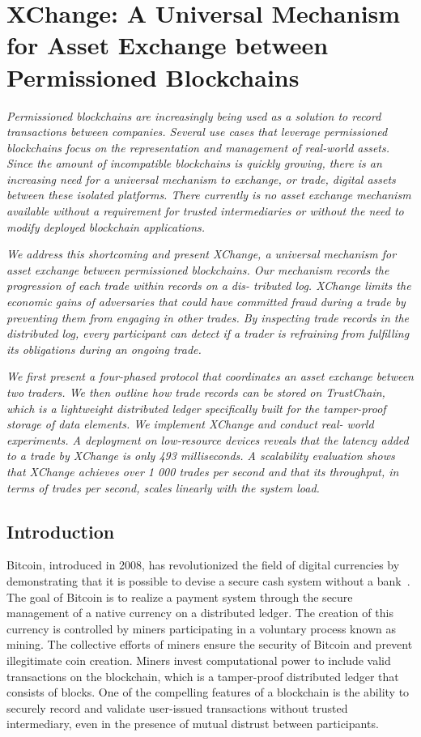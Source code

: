 \chapter{XChange: A Universal Mechanism for Asset Exchange between Permissioned Blockchains}
\label{chapter:xchange}

\emph{Permissioned blockchains are increasingly being used as a solution to record transactions between companies. Several use cases that leverage permissioned blockchains focus on the representation and management of real-world assets. Since the amount of incompatible blockchains is quickly growing, there is an increasing need for a universal mechanism to exchange, or trade, digital assets between these isolated platforms. There currently is no asset exchange mechanism available without a requirement for trusted intermediaries or without the need to modify deployed blockchain applications.}

\emph{We address this shortcoming and present XChange, a universal mechanism for asset exchange between permissioned blockchains. Our mechanism records the progression of each trade within records on a dis- tributed log. XChange limits the economic gains of adversaries that could have committed fraud during a trade by preventing them from engaging in other trades. By inspecting trade records in the distributed log, every participant can detect if a trader is refraining from fulfilling its obligations during an ongoing trade.}

\emph{We first present a four-phased protocol that coordinates an asset exchange between two traders. We then outline how trade records can be stored on TrustChain, which is a lightweight distributed ledger specifically built for the tamper-proof storage of data elements. We implement XChange and conduct real- world experiments. A deployment on low-resource devices reveals that the latency added to a trade by XChange is only 493 milliseconds. A scalability evaluation shows that XChange achieves over 1 000 trades per second and that its throughput, in terms of trades per second, scales linearly with the system load.}

\newpage

\section{Introduction}
Bitcoin, introduced in 2008, has revolutionized the field of digital currencies by demonstrating that it is possible to devise a secure cash system without a bank~\cite{nakamoto2008bitcoin}.
The goal of Bitcoin is to realize a payment system through the secure management of a native currency on a distributed ledger.
The creation of this currency is controlled by miners participating in a voluntary process known as mining.
The collective efforts of miners ensure the security of Bitcoin and prevent illegitimate coin creation.
Miners invest computational power to include valid transactions on the blockchain, which is a tamper-proof distributed ledger that consists of blocks.
One of the compelling features of a blockchain is the ability to securely record and validate user-issued transactions without trusted intermediary, even in the presence of mutual distrust between participants.

